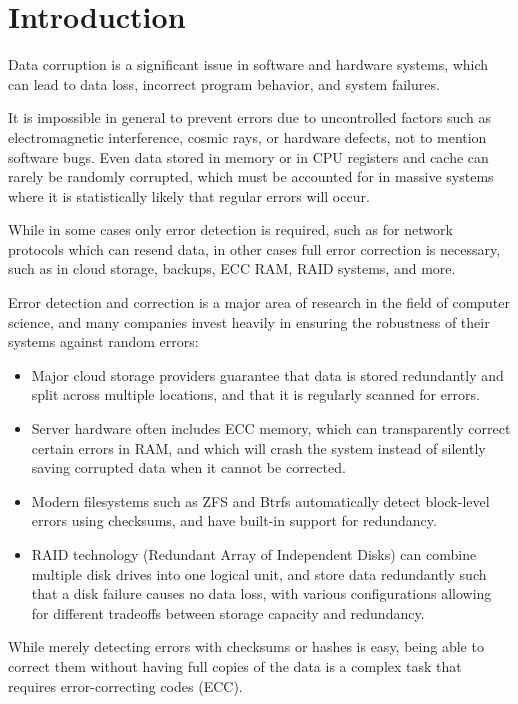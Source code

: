 \chapter{Introduction}

Data corruption is a significant issue in software and hardware systems, which can lead to data loss, incorrect program behavior, and system failures.

It is impossible in general to prevent errors due to uncontrolled factors such as electromagnetic interference, cosmic rays, or hardware defects, not to mention software bugs.
Even data stored in memory or in CPU registers and cache can rarely be randomly corrupted, which must be accounted for in massive systems where it is statistically likely that regular errors will occur.

While in some cases only error detection is required, such as for network protocols which can resend data, in other cases full error correction is necessary, such as in cloud storage, backups, ECC RAM, RAID systems, and more.

Error detection and correction is a major area of research in the field of computer science, and many companies invest heavily in ensuring the robustness of their systems against random errors:

\begin{itemize}
    \item Major cloud storage providers guarantee that data is stored redundantly and split across multiple locations, and that it is regularly scanned for errors.
    \item Server hardware often includes ECC memory, which can transparently correct certain errors in RAM, and which will crash the system instead of silently saving corrupted data when it cannot be corrected.
    \item Modern filesystems such as ZFS and Btrfs automatically detect block-level errors using checksums, and have built-in support for redundancy.
    \item RAID technology (Redundant Array of Independent Disks) can combine multiple disk drives into one logical unit, and store data redundantly such that a disk failure causes no data loss,
          with various configurations allowing for different tradeoffs between storage capacity and redundancy.
\end{itemize}

While merely detecting errors with checksums or hashes is easy, being able to correct them without having full copies of the data is a complex task that requires error-correcting codes (ECC).

